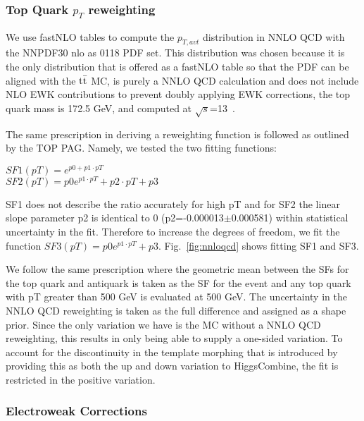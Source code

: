 \subsubsection{Top Quark $p_T$ reweighting}
\label{sec:TopPt}
We use fastNLO tables to compute the $p_{T,avt}$ distribution in NNLO QCD with the NNPDF30 nlo as 0118 PDF set. This distribution was chosen because it is the only distribution that is offered as a fastNLO table so that the PDF can be aligned with the $\mathrm{t\bar{t}}$ MC, is purely a NNLO QCD calculation and does not include NLO EWK contributions to prevent doubly applying EWK corrections, the top quark mass is 172.5 GeV, and computed at $\sqrt{s}$=13~\TeV. 

The same prescription in deriving a reweighting function is followed as outlined by the TOP PAG. Namely, we tested the two fitting functions:

$SF1(pT)=e^{p0+p1 \cdot pT}$ \\
$SF2(pT)=p0 e^{p1\cdot pT}+p2 \cdot pT+p3$

SF1 does not describe the ratio accurately for high pT and for SF2 the linear slope parameter p2 is identical to 0 (p2=-0.000013$\pm$0.000581) within statistical uncertainty in the fit. Therefore to increase the degrees of freedom, we fit the function $SF3(pT)=p0e^{p1 \cdot pT}+p3$. Fig.~\ref{fig:nnloqcd} shows fitting SF1 and SF3.


We follow the same prescription where the geometric mean between the SFs for the top quark and antiquark is taken as the SF for the event and any top quark with pT greater than 500 GeV is evaluated at 500 GeV. The uncertainty in the NNLO QCD reweighting is taken as the full difference and assigned as a shape prior. Since the only variation we have is the \ttbar MC without a NNLO QCD reweighting, this results in only being able to supply a one-sided variation. To account for the discontinuity in the template morphing that is introduced by providing this as both the up and down variation to HiggsCombine, the fit is restricted in the positive variation.

\subsubsection{Electroweak Corrections}
\label{sec:EWK_Corrections}

